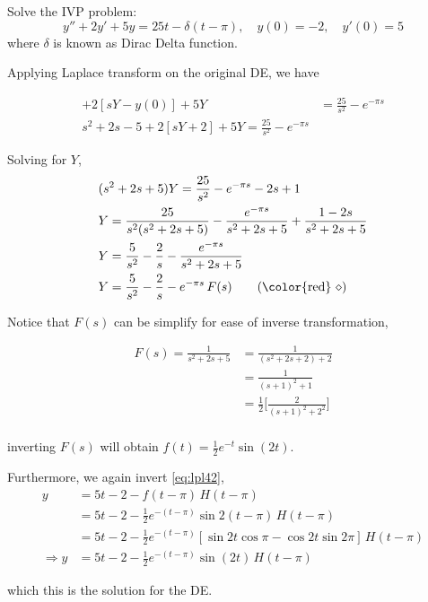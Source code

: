 \begin{example}
    Solve the IVP problem:
    \[
        y'' + 2y' + 5y = 25t - \delta(t - \pi), \quad y(0) = -2, \quad y'(0) = 5
    \]
    where $\delta$ is known as Dirac Delta function.
\end{example}
\begin{solution}
    Applying Laplace transform on the original DE, we have

    \begin{align*}
        [s^2Y - sy(0) - y'(0)] + 2[sY - y(0)] + 5Y &= \frac{25}{s^2} - e^{-\pi s}\\
        s^2 + 2s - 5 + 2[sY + 2] + 5Y = \frac{25}{s^2} - e^{-\pi s}
    \end{align*} 

    Solving for $Y$, 
    \begin{align*}
        &(s^2 + 2s + 5)Y = \frac{25}{s^2} - e^{-\pi s} - 2s + 1\\
        &Y = \frac{25}{s^2(s^2+2s+5)} - \frac{e^{-\pi s}}{s^2 + 2s + 5} + \frac{1-2s}{s^2 + 2s +5}\\
        &Y = \frac{5}{s^2} - \frac{2}{s} - \frac{e^{-\pi s}}{s^2 + 2s + 5}\\
        &Y = \frac{5}{s^2} - \frac{2}{s} - e^{-\pi s}\, F(s) \label{eq:lpl42} \tag{{\color{red} $\diamond$}}
    \end{align*}

    Notice that $F(s)$ can be simplify for ease of inverse transformation,

    \begin{align*}
        F(s) = \frac{1}{s^2 + 2s + 5} &= \frac{1}{(s^2 + 2s + 2) + 2}\\
        &= \frac{1}{(s + 1)^2 + 1}\\
        &= \frac{1}{2} \biggl[\frac{2}{(s + 1)^2 + 2^2}\biggr]\\
    \end{align*}

    inverting $F(s)$ will obtain $f(t) = \displaystyle \frac{1}{2} e^{-t} \sin(2t)$. 

    Furthermore, we again invert \eqref{eq:lpl42},
    \begin{align*}
        y &= 5t - 2 - f(t - \pi)\, H(t - \pi)\\
        &= 5t - 2 - \frac{1}{2}e^{-(t-\pi)} \sin 2(t-\pi)\, H(t - \pi)\\
        &= 5t - 2 - \frac{1}{2}e^{-(t-\pi)} [\sin 2t \cos \pi - \cos 2t \sin 2\pi]\, H(t - \pi)\\
        \Rightarrow y &= 5t - 2 - \frac{1}{2}e^{-(t-\pi)} \sin(2t) \, H(t - \pi)
    \end{align*}

    which this is the solution for the DE.
\end{solution}

